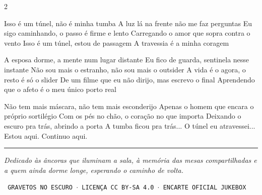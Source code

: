 \documentclass[10pt]{article}
\begin{document}
\begin{multicols}{2}
{Isso é um túnel, não é minha tumba
A luz lá na frente não me faz perguntas
Eu sigo caminhando, o passo é firme e lento
Carregando o amor que sopra contra o vento
Isso é um túnel, estou de passagem
A travessia é a minha coragem

A esposa dorme, a mente num lugar distante
Eu fico de guarda, sentinela nesse instante
Não sou mais o estranho, não sou mais o outsider
A vida é o agora, o resto é só o slider
De um filme que eu não dirijo, mas escrevo o final
Aprendendo que o afeto é o meu único porto real

Não tem mais máscara, não tem mais esconderijo
Apenas o homem que encara o próprio sortilégio
Com os pés no chão, o coração no que importa
Deixando o escuro pra trás, abrindo a porta
A tumba ficou pra trás... O túnel eu atravessei...
Estou aqui. Continuo aqui.
}

\end{multicols}

\vspace{0.15cm}
\begin{center}
  {\color{vinylrust}\rule{\textwidth}{0.8pt}}\par\vspace{0.08cm}
  {\itshape\footnotesize\color{vinylink} Dedicado às âncoras que iluminam a sala, à memória das mesas compartilhadas e a quem ainda dorme longe, esperando o caminho de volta.}\par
  \vspace{0.04cm}
  {\texttt{\scriptsize\color{vinylmuted} GRAVETOS NO ESCURO $\cdot$ LICENÇA CC BY-SA 4.0 $\cdot$ ENCARTE OFICIAL JUKEBOX}}
\end{center}
\end{document}
